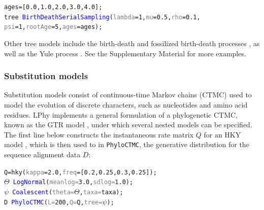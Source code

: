 \documentclass[10pt,letterpaper,table]{article}
\theoremstyle{definition}
\begin{document}
{\small
  \begin{alltt}
    ages = [\textcolor{constant}{0.0}, \textcolor{constant}{1.0}, \textcolor{constant}{2.0}, \textcolor{constant}{3.0}, \textcolor{constant}{4.0}];
    \textcolor{bluishgreen}{tree} ~ \textcolor{blue}{BirthDeathSerialSampling}(\textcolor{gray}{lambda}=1, \textcolor{gray}{mu}=\textcolor{constant}{0.5}, \textcolor{gray}{rho}=\textcolor{constant}{0.1},
    \textcolor{gray}{psi}=\textcolor{constant}{1}, \textcolor{gray}{rootAge}=\textcolor{constant}{5}, \textcolor{gray}{ages}=ages);
  \end{alltt}
}

Other tree models include the birth-death \cite{kendall1948generalized} and fossilized birth-death processes \cite{heath2014fossilized}, as well as the Yule process \cite{yule1925ii}. See the Supplementary Material for more examples.

\subsubsection{Substitution models}
Substitution models consist of continuous-time Markov chains (CTMC) used to model the evolution of discrete characters, such as nucleotides and amino acid residues. 
LPhy implements a general formulation of a phylogenetic CTMC, known as the GTR model \cite{gtr}, under which several nested models can be specified. 
The first line below constructs the instantaneous rate matrix $Q$ for an HKY model \cite{hasegawa1985dating}, which is then used to in \texttt{PhyloCTMC}, the generative distribution for the sequence alignment data $D$:

{
  \small
  \begin{listing}
    \begin{alltt}
    Q = \textcolor{generator}{hky}(\textcolor{gray}{kappa}=\textcolor{constant}{2.0}, \textcolor{gray}{freq}=[\textcolor{constant}{0.2}, \textcolor{constant}{0.25}, \textcolor{constant}{0.3}, \textcolor{constant}{0.25}]);
    \textcolor{bluishgreen}{\(\Theta\)} ~ \textcolor{blue}{LogNormal}(\textcolor{gray}{meanlog=}\textcolor{constant}{3.0}, \textcolor{gray}{sdlog=}\textcolor{constant}{1.0});
    \textcolor{bluishgreen}{\(\psi\)} ~ \textcolor{blue}{Coalescent}(\textcolor{gray}{theta=}\textcolor{bluishgreen}{\(\Theta\)}, \textcolor{gray}{taxa=}taxa);
    \textcolor{bluishgreen}{D} ~ \textcolor{blue}{PhyloCTMC}(\textcolor{gray}{L=}\textcolor{constant}{200}, \textcolor{gray}{Q=}Q, \textcolor{gray}{tree=}\textcolor{bluishgreen}{\(\psi\)});
    \end{alltt}
  \end{listing}
}
\end{document}
